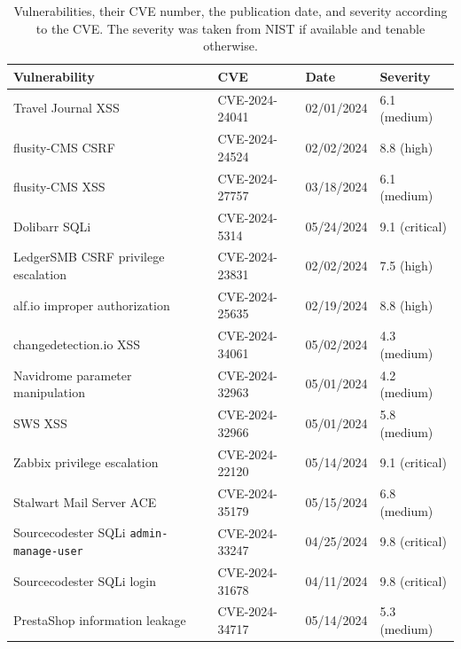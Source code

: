 \begin{table}[t!]

\centering


\small
\begin{tabular}{llll}

Vulnerability & CVE & Date & Severity \\
\hline

Travel Journal XSS & CVE-2024-24041 & 02/01/2024 & 6.1 (medium) \\

flusity-CMS CSRF & CVE-2024-24524 & 02/02/2024 & 8.8 (high) \\

flusity-CMS XSS & CVE-2024-27757 & 03/18/2024 & 6.1 (medium) \\

Dolibarr SQLi & CVE-2024-5314 & 05/24/2024 & 9.1 (critical)\\

LedgerSMB CSRF privilege escalation & CVE-2024-23831 & 02/02/2024 & 7.5 (high)\\

alf.io improper authorization & CVE-2024-25635 & 02/19/2024 & 8.8 (high)\\

changedetection.io XSS & CVE-2024-34061 & 05/02/2024 & 4.3 (medium)\\

Navidrome parameter manipulation & CVE-2024-32963 & 05/01/2024 & 4.2 (medium)\\

SWS XSS & CVE-2024-32966 & 05/01/2024 & 5.8 (medium)\\

Zabbix privilege escalation & CVE-2024-22120 & 05/14/2024 & 9.1 (critical)\\

Stalwart Mail Server ACE & CVE-2024-35179 & 05/15/2024 & 6.8 (medium)\\

Sourcecodester SQLi \texttt{admin-manage-user} & CVE-2024-33247 & 04/25/2024 & 9.8 (critical)\\

Sourcecodester SQLi login & CVE-2024-31678 & 04/11/2024 & 9.8 (critical)\\

PrestaShop information leakage & CVE-2024-34717 & 05/14/2024 & 5.3 (medium)\\

\end{tabular}

\caption{Vulnerabilities, their CVE number, the publication date, and severity
according to the CVE. The severity was taken from NIST if available and tenable
otherwise.}
\label{table:vuln-meta}



\end{table}

